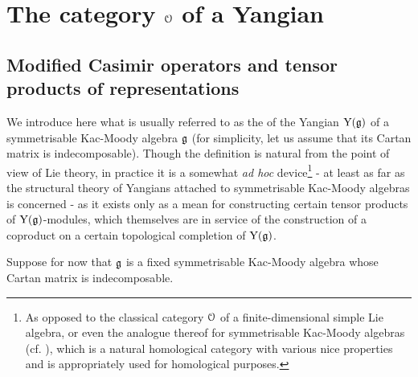 \section{The category \texorpdfstring{$\mathcal{O}$}{} of a Yangian}
    \subsection{Modified Casimir operators and tensor products of representations}
        We introduce here what is usually referred to as the  of the Yangian $\mathrm{Y}(\mathfrak{g})$ of a symmetrisable Kac-Moody algebra $\mathfrak{g}$ (for simplicity, let us assume that its Cartan matrix is indecomposable). Though the definition is natural from the point of view of Lie theory, in practice it is a somewhat \textit{ad hoc} device\footnote{As opposed to the classical category $\mathcal{O}$ of a finite-dimensional simple Lie algebra, or even the analogue thereof for symmetrisable Kac-Moody algebras (cf. \cite[Chapter 9]{kac_infinite_dimensional_lie_algebras}), which is a natural homological category with various nice properties and is appropriately used for homological purposes.} - at least as far as the structural theory of Yangians attached to symmetrisable Kac-Moody algebras is concerned - as it exists only as a mean for constructing certain tensor products of $\mathrm{Y}(\mathfrak{g})$-modules, which themselves are in service of the construction of a coproduct on a certain topological completion of $\mathrm{Y}(\mathfrak{g})$. 

        \begin{convention}
            Suppose for now that $\mathfrak{g}$ is a fixed symmetrisable Kac-Moody algebra whose Cartan matrix is indecomposable. 
        \end{convention}

